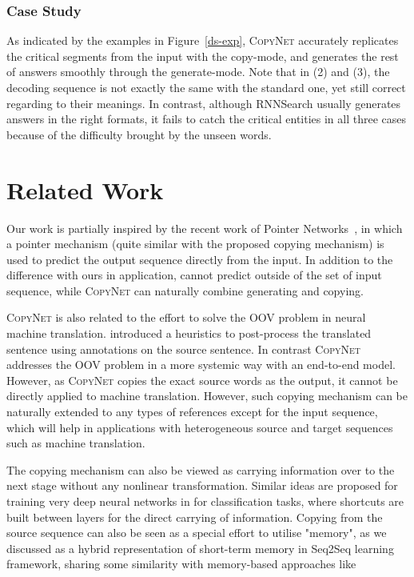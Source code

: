 \subsubsection{Case Study} As indicated by the examples in  Figure~\ref{ds-exp}, \textsc{CopyNet} accurately replicates the critical segments from the input with the copy-mode, and generates the rest of answers smoothly through the generate-mode. Note that in (2) and (3), the decoding sequence is not exactly the same with the standard one, yet still correct regarding to their meanings. In contrast, although RNNSearch usually generates answers in the right formats, it fails to catch the critical entities in all three cases because of the difficulty brought by the unseen words.



\section{Related Work}
Our work is partially inspired by the recent work of Pointer Networks~\cite{vinyals2015pointer}, in which a pointer mechanism (quite similar with the proposed copying mechanism) is used to predict the output sequence directly from the input. In addition to the difference with ours in application, \cite{vinyals2015pointer} cannot predict outside of the set of input sequence, while \textsc{CopyNet} can naturally combine generating and copying.  

\textsc{CopyNet} is also related to the effort to solve the OOV problem in neural machine translation.  introduced a heuristics to post-process the translated sentence using annotations on the source sentence. In contrast \textsc{CopyNet} addresses the OOV problem in a more systemic way with an end-to-end model. However, as \textsc{CopyNet} copies the exact source words as the output, it cannot be directly applied to machine translation. However, such copying mechanism can be naturally extended to any types of references except for the input sequence, which will help in applications with heterogeneous source and target sequences such as machine translation.

The copying mechanism can also be viewed as carrying information over to the next stage without any nonlinear transformation.  Similar ideas are proposed for training very deep neural networks in \cite{srivastava2015highway,he2015deep} for classification tasks, where shortcuts are built between layers for the direct carrying of information.  Copying from the source sequence can also be seen as a special effort to utilise "memory", as we discussed as a hybrid representation of short-term memory in Seq2Seq learning framework, sharing some similarity with memory-based approaches like \cite{weston2014memory,sukhbaatar2015end,graves2014neural}



